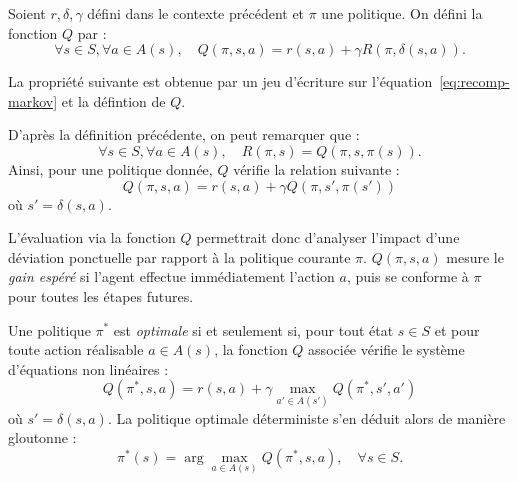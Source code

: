 \begin{definition}[Fonction $Q$]
    Soient $r, \delta, \gamma$ défini dans le contexte précédent et $ \pi$ une politique. On défini la fonction $Q$ par : 
    \begin{equation}
        \forall s \in S, \forall a \in A(s), \quad Q( \pi, s, a) = r(s, a) + \gamma R( \pi, \delta(s, a)). 
    \end{equation}
\end{definition}

La propriété suivante est obtenue par un jeu d'écriture sur l'équation~\ref{eq:recomp-markov} et la défintion de $Q$. 

\begin{prop}
    D'après la définition précédente, on peut remarquer que : 
    \begin{equation}
        \forall s \in S, \forall a \in A(s), \quad R( \pi, s) = Q( \pi, s, \pi(s)). 
    \end{equation}
    Ainsi, pour une politique donnée, $Q$ vérifie la relation suivante : 
    \begin{equation}
        \boxed{Q( \pi, s, a) = r(s, a) + \gamma Q( \pi, s', \pi(s'))}
    \end{equation}
    où $s' = \delta(s,a)$. 
\end{prop}

L'évaluation via la fonction $Q$ permettrait donc d'analyser l'impact d'une déviation ponctuelle par rapport à la politique courante $\pi$. $Q(\pi, s, a)$ mesure le \emph{gain espéré} si l'agent effectue immédiatement l'action $a$, puis se conforme à $\pi$ pour toutes les étapes futures.

\begin{theorem}
    Une politique $\pi^*$ est \emph{optimale} si et seulement si, pour tout état $s \in S$ et pour toute action réalisable $a \in A(s)$, la fonction $Q$ associée vérifie le système d'équations non linéaires :
    \begin{equation}
        Q(\pi^*, s, a) = r(s, a) + \gamma \max_{a' \in A(s')} Q(\pi^*, s', a')
    \end{equation}
    où $s' = \delta(s, a)$. 
    La politique optimale déterministe s'en déduit alors de manière gloutonne :
    \begin{equation}
        \label{eq:system-max-bellman}
        \pi^*(s) = \arg\max_{a \in A(s)} Q(\pi^*, s, a), \quad \forall s \in S.
    \end{equation}
\end{theorem}

